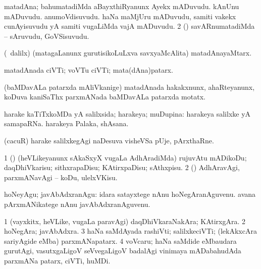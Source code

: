 \bentry
{} 
\gl{\nA}
\expl{}
\bmng
\bnum
{} matadAna; bahumatadiMda 
\banum
{} aBayxthiRyanunx Ayekx mADuvudu. 
 kAnUnu mADuvudu. 
 anumoVdisuvudu. 
 haNa maMjUru mADuvudu, samiti \mo vakekx cunAyisuvudu yA samiti \mo vugaLiMda vajA mADuvudu. 
\eanum
\numie
\num{2} (\AmA) savARnumatadiMda -- sAruvudu, GoVSisuvudu. 
\enum
\emng
\eentry

\bentry
{} 
\gl{\nA}
\expl{}
\bmng
 (\kanmu\ \ame dalilx) (matagaLanunx gurutisikoLuLxva savxyaMcAlita) matadAnayaMtarx. 
\emng
\eentry

\bentry
{} 
\gl{\nA}
\expl{}
\bmng
 matadAnada ciVTi; voVTu ciVTi; mata(dAna)patarx. 
\emng
\eentry

\bentry 
{}
\gl{\nA}
\expl{}
\bmng
 (baMDavALa patarxda mAliVkanige) matadAnada hakakxnunx, ahaRteyanunx, koDuva kaniSaThx parxmANada baMDavALa patarxda motatx. 
\emng
\eentry

\bentry 
{} 
\gl{\gu}
\bmng
 harake kaTiTxkoMDa yA salilxsida; harakeya; muDupina:  harakeya salilxke yA samapaRNa.  harakeya Palaka, shAsana. 
\emng
\eentry

\bentry
{}
\gl{\nA}
\expl{}
\bmng
 (cacuR) harake salilxkegAgi naDesuva visheVSa pUje, pArxthaRne. 
\emng
\eentry

\bentry 
{} 
\gl{\akirx}
\expl{}
\bmng
\bnum
\num{1} (\pArxparx) (heVLikeyanunx sAkaSxyX \mo vugaLa AdhAradiMda) rujuvAtu mADikoDu; daqDhiVkarisu; sithxrapaDisu; KAtirxpaDisu; sAthxpisu. 
\num{2} (\pArxparx) AdhAravAgi, parxmANavAgi -- koDu, ulelxVKisu. 
\enum
\emng

\noindent 
\gl{\akirx}
\expl{}
\bmng
 hoNeyAgu; javAbAdxranAgu:  idara satayxtege nAnu hoNegAranAguvenu.  avana pArxmANikatege nAnu javAbAdxranAguvenu. 
\emng
\eentry

\bentry 
{} 
\gl{\nA}
\expl{}
\bmng
\bnum
\num{1} (vayxkitx, heVLike, \mo vugaLa paravAgi) daqDhiVkaraNakAra; KAtirxgAra. 
\num{2} hoNegAra; javAbAdxra. 
\num{3} haNa saMdAyada rashiVti; salilxkeciVTi; (lekAkxcAra sariyAgide eMba) parxmANapatarx. 
\num{4} voVcaru; haNa saMdide eMbaudara gurutAgi, vasutxgaLigoV seVvegaLigoV badalAgi vinimaya mADabahudAda parxmANa patarx, ciVTi, huMDi. 
\enum
\emng
\eentry

